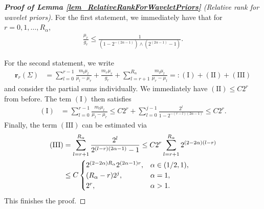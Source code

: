 \documentclass[a4paper,11pt]{article} %
\numberwithin{equation}{section}
\theoremstyle{definition}
\theoremstyle{remark}
\theoremstyle{plain}
\begin{document}
\begin{proof}[\normalfont \textbf{Proof of Lemma \ref{lem_RelativeRankForWaveletPriors}} (Relative rank for wavelet priors)]%
  \label{prf_RelativeRankForWaveletPriors}
  For the first statement, we immediately have that for \( r = 0, 1, \dots, R_{\alpha} \), 
  \begin{align}
    \frac{\mu_{r}}{g_{r}} \le \frac{1}{(1 - 2^{-(2 \alpha - 1)}) \land (2^{(2 \alpha - 1)} - 1)}.
  \end{align}

  For the second statement, we write
  \begin{align}
    \mathbf{r}_{r}(\Sigma) 
    & = 
    \sum_{l = 0}^{r - 1} \frac{m_{l} \mu_{l}}{\mu_{l} - \mu_{r}} 
    + 
    \frac{m_{r} \mu_{r}}{g_{r}} 
    + 
    \sum_{l = r + 1}^{R_{\alpha}} \frac{m_{l} \mu_{l}}{\mu_{r} - \mu_{l}} 
    =: 
    (\text{I}) + (\text{II}) + (\text{III})
  \end{align}
  and consider the partial sums individually.
  We immediately have \( (\text{II}) \le C 2^{r} \) from before. 
  The tem \( (\text{I}) \) then satisfies
  \begin{align}
    (\text{I}) 
    & = 
    \sum_{l = 0}^{r - 1} \frac{m_{l} \mu_{l}}{\mu_{l} - \mu_{r}} 
    \le 
    C 2^{r} 
    + 
    \sum_{l = 0}^{j - 1} \frac{2^{l}}{1 - 2^{-(r - l) (2 \alpha - 1 )}} 
    \le 
    C 2^{r}.
  \end{align}
  Finally, the term \( (\text{III}) \) can be estimated via
  \begin{align}
    (\text{III}) & =   \sum_{l = r + 1}^{R_{\alpha}} 
                       \frac{2^{l}}{2^{(l - r) (2 \alpha - 1)} - 1} 
                   \le 
                       C 2^{r} \sum_{l = r + 1}^{R_{\alpha}} 2^{(2 - 2 \alpha) (l - r)} 
    \\
                 & \le 
                       C \begin{cases}
                           2^{(2 - 2 \alpha) R_{\alpha}} 2^{(2 \alpha - 1) r}, & \alpha \in (1/2, 1), \\
                           (R_{\alpha} - r) 2^{j},                             & \alpha = 1, \\
                           2^{r},                                              & \alpha > 1. \\ 
                       \end{cases}
    \notag
  \end{align}
  This finishes the proof.
\end{proof}%
\end{document}
